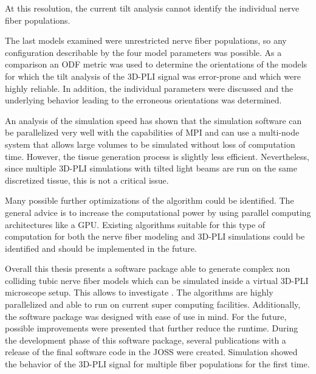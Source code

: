 At this resolution, the current tilt analysis cannot identify the individual nerve fiber populations.
\par
% 
The last models examined were unrestricted nerve fiber populations, so any configuration describable by the four model parameters was possible.
As a comparison an \ac{ODF} metric was used to determine the orientations of the models for which the tilt analysis of the \ac{3D-PLI} signal was error-prone and which were highly reliable.
In addition, the individual parameters were discussed and the underlying behavior leading to the erroneous orientations was determined.
\par
% 
An analysis of the simulation speed has shown that the simulation software can be parallelized very well with the capabilities of \ac{MPI} and can use a multi-node system that allows large volumes to be simulated without loss of computation time.
However, the tissue generation process is slightly less efficient.
Nevertheless, since multiple \ac{3D-PLI} simulations with tilted light beams are run on the same discretized tissue, this is not a critical issue.
\par
% 
Many possible further optimizations of the algorithm could be identified.
The general advice is to increase the computational power by using parallel computing architectures like a \ac{GPU}.
Existing algorithms suitable for this type of computation for both the nerve fiber modeling and \ac{3D-PLI} simulations could be identified and should be implemented in the future.
\par
% 
Overall this thesis presents a software package able to generate complex non colliding tubic nerve fiber models which can be simulated inside a virtual \ac{3D-PLI} microscope setup.
This allows to investigate \dummy{}.
% 
The algorithms are highly parallelized and able to run on current super computing facilities.
Additionally, the software package was designed with ease of use in mind.
% 
For the future, possible improvements were presented that further reduce the runtime.
% 
During the development phase of this software package, several publications with a release of the final software code in the \ac{JOSS} were created.
% 
Simulation showed the behavior of the \ac{3D-PLI} signal for multiple fiber populations for the first time.